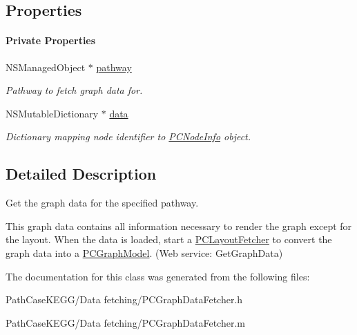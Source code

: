 \subsection*{Properties}
\begin{Indent}\paragraph*{Private Properties}
\begin{DoxyCompactItemize}
\item 
\hypertarget{interface_p_c_graph_data_fetcher_a11e587159c08621ff285a864251921aa}{
NSManagedObject $\ast$ \hyperlink{interface_p_c_graph_data_fetcher_a11e587159c08621ff285a864251921aa}{pathway}}
\label{interface_p_c_graph_data_fetcher_a11e587159c08621ff285a864251921aa}

\begin{DoxyCompactList}\small\item\em Pathway to fetch graph data for. \end{DoxyCompactList}\item 
\hypertarget{interface_p_c_graph_data_fetcher_a09a4c8890192102366e5570b9dd89da2}{
NSMutableDictionary $\ast$ \hyperlink{interface_p_c_graph_data_fetcher_a09a4c8890192102366e5570b9dd89da2}{data}}
\label{interface_p_c_graph_data_fetcher_a09a4c8890192102366e5570b9dd89da2}

\begin{DoxyCompactList}\small\item\em Dictionary mapping node identifier to \hyperlink{interface_p_c_node_info}{PCNodeInfo} object. \end{DoxyCompactList}\end{DoxyCompactItemize}
\end{Indent}


\subsection{Detailed Description}
Get the graph data for the specified pathway. 

This graph data contains all information necessary to render the graph except for the layout. When the data is loaded, start a \hyperlink{interface_p_c_layout_fetcher}{PCLayoutFetcher} to convert the graph data into a \hyperlink{interface_p_c_graph_model}{PCGraphModel}. (Web service: {\ttfamily GetGraphData}) 

The documentation for this class was generated from the following files:\begin{DoxyCompactItemize}
\item 
PathCaseKEGG/Data fetching/PCGraphDataFetcher.h\item 
PathCaseKEGG/Data fetching/PCGraphDataFetcher.m\end{DoxyCompactItemize}
